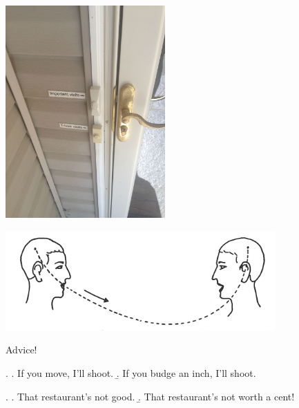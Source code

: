 \documentclass[compress]{beamer}
\begin{document}
\begin{frame}{}
     \begin{center}
	\includegraphics[height=3.2in]{doorbells.jpg}   
     \end{center}
\end{frame}

\begin{frame}{}
     \begin{center}
	\includegraphics[height=1.5in]{saussure.jpg}   
     \end{center}
\end{frame}

\begin{frame}{Advice!}
      \begin{block}{}
      \ex. \a. If you move, I'll shoot.
	   \b. If you budge an inch, I'll shoot.

      \end{block}
      \begin{block}{}
	 \ex. \a. That restaurant's not good.
	      \b. That restaurant's not worth a cent!

      \end{block}
\end{frame}
\end{document}

